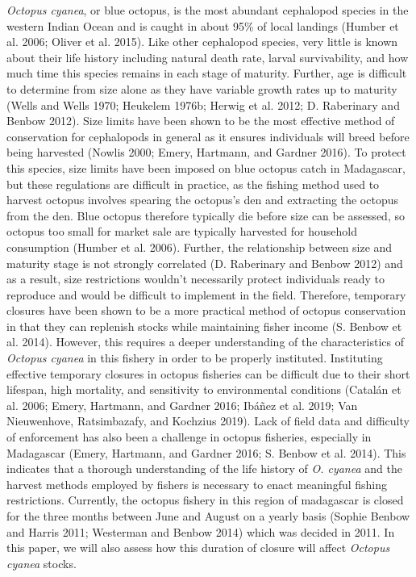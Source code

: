 \documentclass[
]{article}
\begin{document}
\emph{Octopus cyanea}, or blue octopus, is the most abundant cephalopod species in the western Indian Ocean and is caught in about 95\% of local landings (Humber et al. 2006; Oliver et al. 2015). Like other cephalopod species, very little is known about their life history including natural death rate, larval survivability, and how much time this species remains in each stage of maturity. Further, age is difficult to determine from size alone as they have variable growth rates up to maturity (Wells and Wells 1970; Heukelem 1976b; Herwig et al. 2012; D. Raberinary and Benbow 2012). Size limits have been shown to be the most effective method of conservation for cephalopods in general as it ensures individuals will breed before being harvested (Nowlis 2000; Emery, Hartmann, and Gardner 2016). To protect this species, size limits have been imposed on blue octopus catch in Madagascar, but these regulations are difficult in practice, as the fishing method used to harvest octopus involves spearing the octopus's den and extracting the octopus from the den. Blue octopus therefore typically die before size can be assessed, so octopus too small for market sale are typically harvested for household consumption (Humber et al. 2006). Further, the relationship between size and maturity stage is not strongly correlated (D. Raberinary and Benbow 2012) and as a result, size restrictions wouldn't necessarily protect individuals ready to reproduce and would be difficult to implement in the field. Therefore, temporary closures have been shown to be a more practical method of octopus conservation in that they can replenish stocks while maintaining fisher income (S. Benbow et al. 2014). However, this requires a deeper understanding of the characteristics of \emph{Octopus cyanea} in this fishery in order to be properly instituted. Instituting effective temporary closures in octopus fisheries can be difficult due to their short lifespan, high mortality, and sensitivity to environmental conditions (Catalán et al. 2006; Emery, Hartmann, and Gardner 2016; Ibáñez et al. 2019; Van Nieuwenhove, Ratsimbazafy, and Kochzius 2019). Lack of field data and difficulty of enforcement has also been a challenge in octopus fisheries, especially in Madagascar (Emery, Hartmann, and Gardner 2016; S. Benbow et al. 2014). This indicates that a thorough understanding of the life history of \emph{O. cyanea} and the harvest methods employed by fishers is necessary to enact meaningful fishing restrictions. Currently, the octopus fishery in this region of madagascar is closed for the three months between June and August on a yearly basis (Sophie Benbow and Harris 2011; Westerman and Benbow 2014) which was decided in 2011. In this paper, we will also assess how this duration of closure will affect \emph{Octopus cyanea} stocks.
\end{document}
